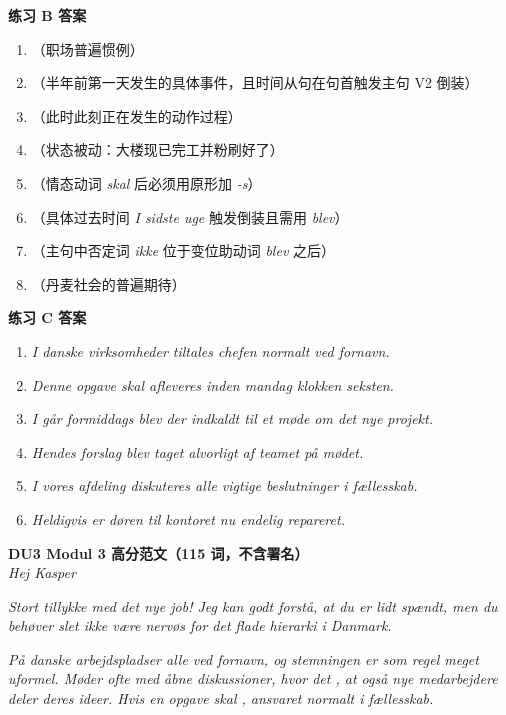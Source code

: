 \begin{answerbox}
\textbf{练习 B 答案}
\begin{enumerate}
  \item {}（职场普遍惯例）
  \item {}（半年前第一天发生的具体事件，且时间从句在句首触发主句 V2 倒装）
  \item {}（此时此刻正在发生的动作过程）
  \item {}（状态被动：大楼现已完工并粉刷好了）
  \item {}（情态动词 \textit{skal} 后必须用原形加 \textit{-s}）
  \item {}（具体过去时间 \textit{I sidste uge} 触发倒装且需用 \textit{blev}）
  \item {}（主句中否定词 \textit{ikke} 位于变位助动词 \textit{blev} 之后）
  \item {}（丹麦社会的普遍期待）
\end{enumerate}

\textbf{练习 C 答案}
\begin{enumerate}
  \item \textit{I danske virksomheder tiltales chefen normalt ved fornavn.}
  \item \textit{Denne opgave skal afleveres inden mandag klokken seksten.}
  \item \textit{I går formiddags blev der indkaldt til et møde om det nye projekt.}
  \item \textit{Hendes forslag blev taget alvorligt af teamet på mødet.}
  \item \textit{I vores afdeling diskuteres alle vigtige beslutninger i fællesskab.}
  \item \textit{Heldigvis er døren til kontoret nu endelig repareret.}
\end{enumerate}

\textbf{DU3 Modul 3 高分范文（115 词，不含署名）}\\
\textit{Hej Kasper}

\textit{Stort tillykke med det nye job! Jeg kan godt forstå, at du er lidt spændt, men du behøver slet ikke være nervøs for det flade hierarki i Danmark.}

\textit{På danske arbejdspladser  alle ved fornavn, og stemningen er som regel meget uformel. Møder  ofte med åbne diskussioner, hvor det , at også nye medarbejdere deler deres ideer. Hvis en opgave skal ,  ansvaret normalt i fællesskab.}


\end{answerbox}
